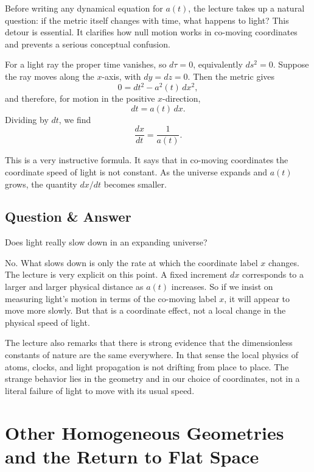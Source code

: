 Before writing any dynamical equation for \(a(t)\), the lecture takes up a natural question: if the metric itself changes with time, what happens to light? This detour is essential. It clarifies how null motion works in co-moving coordinates and prevents a serious conceptual confusion.

For a light ray the proper time vanishes, so \(d\tau=0\), equivalently \(ds^2=0\). Suppose the ray moves along the \(x\)-axis, with \(dy=dz=0\). Then the metric gives
\begin{equation}
0 = dt^2 - a^2(t)\,dx^2,
\end{equation}
and therefore, for motion in the positive \(x\)-direction,
\begin{equation}
dt = a(t)\,dx.
\end{equation}
Dividing by \(dt\), we find
\begin{equation}
\frac{dx}{dt} = \frac{1}{a(t)}.
\end{equation}

This is a very instructive formula. It says that in co-moving coordinates the coordinate speed of light is not constant. As the universe expands and \(a(t)\) grows, the quantity \(dx/dt\) becomes smaller.

\subsection{Question \& Answer}

Does light really slow down in an expanding universe?

No. What slows down is only the rate at which the coordinate label \(x\) changes. The lecture is very explicit on this point. A fixed increment \(dx\) corresponds to a larger and larger physical distance as \(a(t)\) increases. So if we insist on measuring light's motion in terms of the co-moving label \(x\), it will appear to move more slowly. But that is a coordinate effect, not a local change in the physical speed of light.

The lecture also remarks that there is strong evidence that the dimensionless constants of nature are the same everywhere. In that sense the local physics of atoms, clocks, and light propagation is not drifting from place to place. The strange behavior lies in the geometry and in our choice of coordinates, not in a literal failure of light to move with its usual speed.

\section{Other Homogeneous Geometries and the Return to Flat Space}

